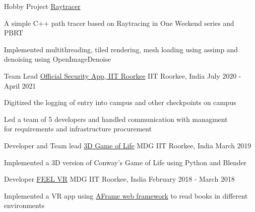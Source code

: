 \begin{cventries}
   \cventry
    {Hobby Project}
    {\href{https://github.com/KarthikRIyer/RayTracer}{Raytracer}}
    {}
    {}
    {
      \begin{cvitems}
      \item{A simple C++ path tracer based on Raytracing in One Weekend series and PBRT} 
      \item{Implemented multithreading, tiled rendering, mesh loading using assimp and denoising using OpenImageDenoise} 
      \end{cvitems}
    }
   \cventry
    {Team Lead}
    {\href{https://play.google.com/store/apps/details?id=in.ac.iitr.mdg.securityapp}{Official Security App, IIT Roorkee}}
    {IIT Roorkee, India}
    {July 2020 - April 2021}
    {
      \begin{cvitems}
        \item{Digitized the logging of entry into campus and other checkpoints on campus}
        \item{Led a team of 5 developers and handled communication with managment \\for requirements and infrastructure procurement}
      \end{cvitems}
    }
   \cventry
    {Developer and Team lead}
    {\href{https://github.com/am15h/Game-Of-Life-3D}{3D Game of Life}}
    {MDG IIT Roorkee, India}
    {March 2019}
    {
      \begin{cvitems}
      \item{Implemented a 3D version of Conway's Game of Life using Python and Blender}
      \end{cvitems}
    }
  \cventrylast
    {Developer}
    {\href{https://github.com/KarthikRIyer/FEEL-VR-Book-Reader}{FEEL VR}}
    {MDG IIT Roorkee, India}
    {February 2018 - March 2018}
    {
      \begin{cvitems}
        \item {Implemented a VR app using \href{https://aframe.io/}{AFrame web framework} to read books in different environments}
      \end{cvitems}
     }
\end{cventries}
